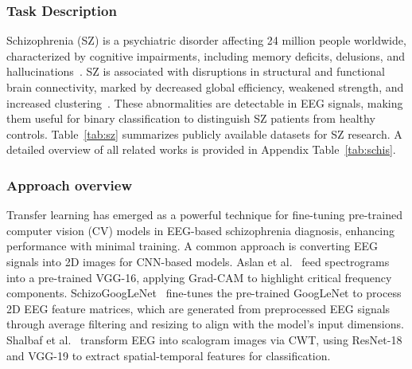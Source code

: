 \subsubsection{Task Description}
Schizophrenia (SZ) is a psychiatric disorder affecting 24 million people worldwide, characterized by cognitive impairments, including memory deficits, delusions, and hallucinations~\cite{WHO_SZ}. 
SZ is associated with disruptions in structural and functional brain connectivity, marked by decreased global efficiency, weakened strength, and increased clustering~\cite{zalesky2011disrupted}. These abnormalities are detectable in EEG signals, making them useful for binary classification to distinguish SZ patients from healthy controls. Table~\ref{tab:sz} summarizes publicly available datasets for SZ research.
A detailed overview of all related works is provided in Appendix Table~\ref{tab:schis}.

\subsubsection{Approach overview}
Transfer learning has emerged as a powerful technique for fine-tuning pre-trained computer vision (CV) models in EEG-based schizophrenia diagnosis, enhancing performance with minimal training.
A common approach is converting EEG signals into 2D images for CNN-based models.
Aslan et al.~\cite{SZ16} feed spectrograms into a pre-trained VGG-16, applying Grad-CAM to highlight critical frequency components.
SchizoGoogLeNet~\cite{SZ21} fine-tunes the pre-trained GoogLeNet to process 2D EEG feature matrices, which are generated from preprocessed EEG signals through average filtering and resizing to align with the model's input dimensions.
Shalbaf et al.~\cite{SZ22} transform EEG into scalogram images via CWT, using ResNet-18 and VGG-19 to extract spatial-temporal features for classification.

